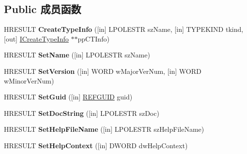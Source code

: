 \subsection*{Public 成员函数}
\begin{DoxyCompactItemize}
\item 
\mbox{\label{interface_i_create_type_lib_aba4a29cd050a051639568b64799f8334}} 
H\+R\+E\+S\+U\+LT {\bfseries Create\+Type\+Info} (\mbox{[}in\mbox{]} L\+P\+O\+L\+E\+S\+TR sz\+Name, \mbox{[}in\mbox{]} T\+Y\+P\+E\+K\+I\+ND tkind, \mbox{[}out\mbox{]} \hyperlink{interface_i_create_type_info}{I\+Create\+Type\+Info} $\ast$$\ast$pp\+C\+T\+Info)
\item 
\mbox{\label{interface_i_create_type_lib_ad7d429b6bc45dfe6f0ffa9ef2b65e405}} 
H\+R\+E\+S\+U\+LT {\bfseries Set\+Name} (\mbox{[}in\mbox{]} L\+P\+O\+L\+E\+S\+TR sz\+Name)
\item 
\mbox{\label{interface_i_create_type_lib_a105a692f305444d765c54b7e95fd6ef0}} 
H\+R\+E\+S\+U\+LT {\bfseries Set\+Version} (\mbox{[}in\mbox{]} W\+O\+RD w\+Major\+Ver\+Num, \mbox{[}in\mbox{]} W\+O\+RD w\+Minor\+Ver\+Num)
\item 
\mbox{\label{interface_i_create_type_lib_a7252939cc343f6a7f3888b4a6753c6a8}} 
H\+R\+E\+S\+U\+LT {\bfseries Set\+Guid} (\mbox{[}in\mbox{]} \hyperlink{struct___g_u_i_d}{R\+E\+F\+G\+U\+ID} guid)
\item 
\mbox{\label{interface_i_create_type_lib_ac1169a5ebb271295c7cc028ef492724d}} 
H\+R\+E\+S\+U\+LT {\bfseries Set\+Doc\+String} (\mbox{[}in\mbox{]} L\+P\+O\+L\+E\+S\+TR sz\+Doc)
\item 
\mbox{\label{interface_i_create_type_lib_a778a67f35c54bbe27636708fe7d05607}} 
H\+R\+E\+S\+U\+LT {\bfseries Set\+Help\+File\+Name} (\mbox{[}in\mbox{]} L\+P\+O\+L\+E\+S\+TR sz\+Help\+File\+Name)
\item 
\mbox{\label{interface_i_create_type_lib_a805b0819a790e3acbae7b886f87c719f}} 
H\+R\+E\+S\+U\+LT {\bfseries Set\+Help\+Context} (\mbox{[}in\mbox{]} D\+W\+O\+RD dw\+Help\+Context)
\item 
$$
\end{DoxyCompactItemize}
